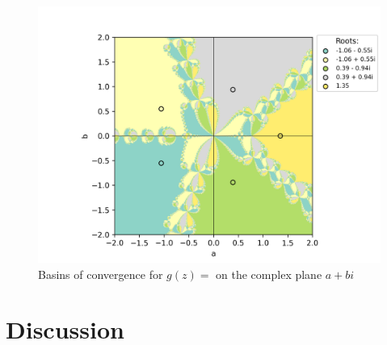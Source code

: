 \documentclass[10pt,a4paper]{article}
\begin{document}
		\begin{figure}[H]
			\caption{Basins of convergence for $g(z) =$ on the complex plane $a+bi$}
			\includegraphics[scale=0.75]{figure6}
		\end{figure}
		

		
	\section{Discussion}
\end{document}
